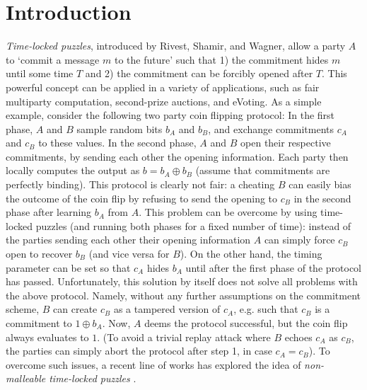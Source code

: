 \section{Introduction}\label{sec:intro}
\emph{Time-locked puzzles}, introduced by Rivest, Shamir, and Wagner, allow a party $A$ to `commit a message $m$ to the future' such that 1) the commitment hides $m$ until some time $T$ and 2) the commitment can be forcibly opened after $T$. This powerful concept can be applied in a variety of applications, such as fair multiparty computation, second-prize auctions, and eVoting. 
As a simple example, consider the following two party coin flipping protocol: In the first phase, $A$ and $B$ sample random bits $b_A$ and $b_B$, and exchange commitments $c_A$ and $c_B$ to these values. In the second phase, $A$ and $B$ open their respective commitments, by sending each other the opening information. Each party then locally computes the output as $b=b_A\oplus b_B$ (assume that commitments are perfectly binding). This protocol is clearly not fair: a cheating $B$ can easily bias the outcome of the coin flip by refusing to send the opening to $c_B$ in the second phase after learning $b_A$ from $A$.
This problem can be overcome by using time-locked puzzles (and running both phases for a fixed number of time): instead of the parties sending each other their opening information $A$ can simply force $c_B$ open to recover $b_B$ (and vice versa for $B$). On the other hand, the timing parameter can be set so that $c_A$ hides $b_A$ until after the first phase of the protocol has passed.
Unfortunately, this solution by itself does not solve all problems with the above protocol. Namely, without any further assumptions on the commitment scheme, $B$ can create $c_B$ as a tampered version of $c_A$, e.g. such that $c_B$ is a commitment to $1\oplus b_A$. Now, $A$ deems the protocol successful, but the coin flip always evaluates to $1$. (To avoid a trivial replay attack where $B$ echoes $c_A$ as $c_B$, the parties can simply abort the protocol after step 1, in case $c_A=c_B$). To overcome such issues, a recent line of works has explored the idea of \emph{non-malleable time-locked puzzles} \cite{TCC:KatLosXu20,EPRINT:EFKP20a,EC:BDDNO21}.

